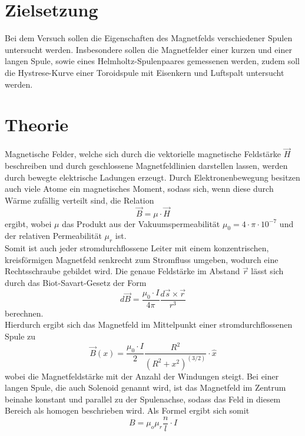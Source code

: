 \section{Zielsetzung}
  Bei dem Versuch sollen die Eigenschaften des Magnetfelds verschiedener Spulen untersucht werden.
  Insbesondere sollen die Magnetfelder einer kurzen und einer langen Spule, sowie eines
  Helmholtz-Spulenpaares gemessenen werden, zudem soll die Hystrese-Kurve einer Toroidspule
  mit Eisenkern und Luftspalt untersucht werden.
\section{Theorie}

Magnetische Felder, welche sich durch die vektorielle magnetische Feldstärke
$\vec{H}$ beschreiben und durch geschlossene Magnetfeldlinien darstellen lassen,
werden durch bewegte elektrische Ladungen erzeugt.
Durch Elektronenbewegung besitzen auch viele Atome ein magnetisches Moment, sodass
sich, wenn diese durch Wärme zufällig verteilt sind, die Relation
\begin{equation}
  \vec{B} = \mu \cdot \vec{H}
  \label{eqn:B1}
\end{equation} ergibt, wobei $ \mu $ das Produkt aus der Vakuumspermeabilität
$ \mu_0 = 4 \cdot \pi \cdot 10^{-7}$ und der relativen Permeabilität $ \mu_r $ ist. \\

\noindent Somit ist auch jeder stromdurchflossene Leiter mit einem konzentrischen,
kreisförmigen Magnetfeld senkrecht zum Stromfluss umgeben, wodurch eine Rechtsschraube gebildet wird.
Die genaue Feldstärke im Abstand $\vec{r}$ lässt sich durch das Biot-Savart-Gesetz
der Form
\begin{equation}
  d\vec{B} = \frac{\mu _0 \cdot I}{4\pi} \frac{d \vec{s} \times \vec{r}}{r^3}
  \label{eqn:Biot}
\end{equation}
berechnen. \\
\noindent Hierdurch ergibt sich das Magnetfeld im Mittelpunkt einer stromdurchflossenen Spule zu
\begin{equation}
  \vec{B}(x) = \frac{\mu_0 \cdot I}{2} \frac{R^2}{(R^2+x^2)^(3/2)} \cdot \hat{x}
  \label{eqn:Biot2}
\end{equation}
wobei die Magnetfeldstärke %
mit der Anzahl der Windungen steigt.
Bei einer langen Spule, die auch Solenoid genannt wird, ist das Magnetfeld im
Zentrum beinahe konstant und parallel zu der Spulenachse, sodass das Feld in diesem
Bereich als homogen beschrieben wird.
Als Formel ergibt sich somit
\begin{equation}
  B= \mu_o \mu_r \frac{n}{l} \cdot I
  \label{eqn:langespule}
\end{equation} \\

